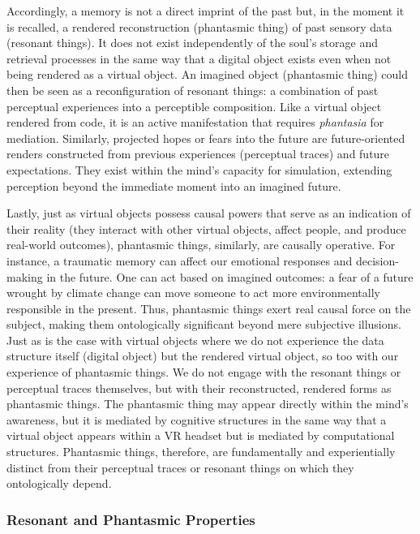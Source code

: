 \documentclass{article}
\begin{document}
Accordingly, a memory is not a direct imprint of the past but, in the moment it is recalled, a rendered reconstruction (phantasmic thing) of past sensory data (resonant things). It does not exist independently of the soul's storage and retrieval processes in the same way that a digital object exists even when not being rendered as a virtual object. An imagined object (phantasmic thing) could then be seen as a reconfiguration of resonant things: a combination of past perceptual experiences into a perceptible composition. Like a virtual object rendered from code, it is an active manifestation that requires \textit{phantasia} for mediation. Similarly, projected hopes or fears into the future are future-oriented renders constructed from previous experiences (perceptual traces) and future expectations. They exist within the mind's capacity for simulation, extending perception beyond the immediate moment into an imagined future.

Lastly, just as virtual objects possess causal powers that serve as an indication of their reality (they interact with other virtual objects, affect people, and produce real-world outcomes), phantasmic things, similarly, are causally operative. For instance, a traumatic memory can affect our emotional responses and decision-making in the future. One can act based on imagined outcomes: a fear of a future wrought by climate change can move someone to act more environmentally responsible in the present. Thus, phantasmic things exert real causal force on the subject, making them ontologically significant beyond mere subjective illusions. Just as is the case with virtual objects where we do not experience the data structure itself (digital object) but the rendered virtual object, so too with our experience of phantasmic things. We do not engage with the resonant things or perceptual traces themselves, but with their reconstructed, rendered forms as phantasmic things. The phantasmic thing may appear directly within the mind's awareness, but it is mediated by cognitive structures in the same way that a virtual object appears within a VR headset but is mediated by computational structures. Phantasmic things, therefore, are fundamentally and experientially distinct from their perceptual traces or resonant things on which they ontologically depend.

\subsubsection*{Resonant and Phantasmic Properties}
\end{document}
